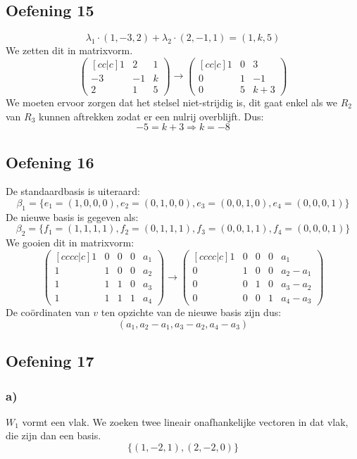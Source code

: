 \documentclass[lineaire_algebra_oplossingen.tex]{subfiles}
\begin{document}
\subsection{Oefening 15}
\[
\lambda_1 \cdot (1,-3,2) + \lambda_2 \cdot (2,-1,1) = (1,k,5)
\]
We zetten dit in matrixvorm.
\[
\begin{pmatrix}[cc|c]
 1 &  2 & 1 \\
-3 & -1 & k \\
 2 &  1 & 5
\end{pmatrix}
\longrightarrow
\begin{pmatrix}[cc|c]
1 & 0 & 3 \\
0 & 1 & -1 \\
0 & 5 & k+3
\end{pmatrix}
\]
We moeten ervoor zorgen dat het stelsel niet-strijdig is, dit gaat enkel als we $R_2$ van $R_3$ kunnen aftrekken zodat er een nulrij overblijft. Dus:
\[
-5 = k+3 \Longrightarrow k = -8
\]

\subsection{Oefening 16}
De standaardbasis is uiteraard:
\[
\beta_1 = \{ e_1 = (1,0,0,0), e_2 = (0,1,0,0), e_3 = (0,0,1,0), e_4 = (0,0,0,1) \}
\]
De nieuwe basis is gegeven als:
\[
\beta_2 = \{ f_1 = (1,1,1,1), f_2 = (0,1,1,1), f_3 = (0,0,1,1), f_4 = (0,0,0,1) \}
\]
We gooien dit in matrixvorm:
\[
\begin{pmatrix}[cccc|c]
1 &0 &0 &0 & a_1 \\
1 &1 &0 &0 & a_2 \\
1 &1 &1 &0 & a_3 \\
1 &1 &1 &1 & a_4
\end{pmatrix}
\longrightarrow
\begin{pmatrix}[cccc|c]
1 &0 &0 &0 & a_1 \\
0 &1 &0 &0 & a_2-a_1 \\
0 &0 &1 &0 & a_3-a_2\\
0 &0 &0 &1 & a_4-a_3
\end{pmatrix}
\]
De co\"ordinaten van $v$ ten opzichte van de nieuwe basis zijn dus:
\[
(a_1, a_2-a_1, a_3-a_2, a_4-a_3)
\]

\subsection{Oefening 17}
\subsubsection*{a)}
$W_1$ vormt een vlak. We zoeken twee lineair onafhankelijke vectoren in dat vlak, die zijn dan een basis.
\[
\{(1,-2,1),(2,-2,0)\}
\]
\end{document}

